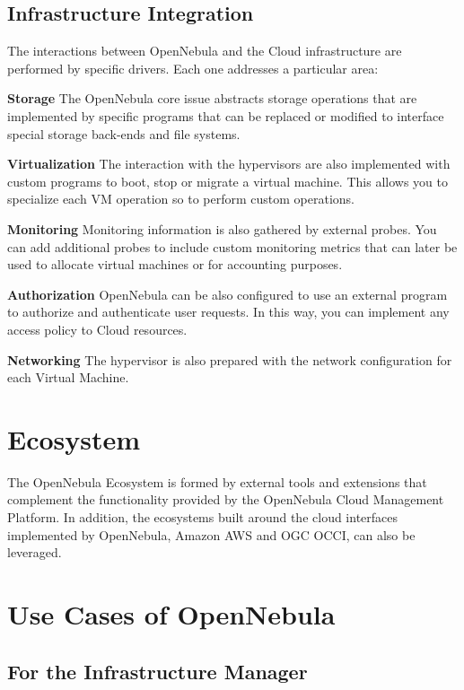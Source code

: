 \documentclass[9pt,twocolumn,twoside]{styles/osajnl}
\newcommand{\TODO}[2][]{\todo[color=red!10,inline,#1]{#2}}
\newcommand{\TE}{\TODO{Term}}
\begin{document}
\subsection{Infrastructure Integration}

The interactions between OpenNebula and the {Cloud 
infrastructure}\cite{www-opennebula-infraintegration} are 
performed by specific drivers. Each one addresses a particular area:

\textbf{Storage} The OpenNebula core \TE issue abstracts storage 
operations that are implemented by specific programs that can be 
replaced or modified to interface special storage back-ends and file 
systems.

\textbf{Virtualization} The interaction with the hypervisors are also 
implemented with custom programs to boot, stop or migrate a virtual 
machine. This allows you to specialize each VM operation so to 
perform custom operations.

\textbf{Monitoring} Monitoring information is also gathered by 
external probes. You can add additional probes to include custom 
monitoring metrics that can later be used to allocate virtual 
machines or for accounting purposes.

\textbf{Authorization} OpenNebula can be also configured to use an 
external program to authorize and authenticate user requests. In this 
way, you can implement any access policy to Cloud resources.

\textbf{Networking} The hypervisor is also prepared with the network 
configuration for each Virtual Machine.

\section{Ecosystem}

The {OpenNebula Ecosystem}\cite{www-opennebula-ecosystem} is formed by
external tools and extensions that complement the functionality
provided by the OpenNebula Cloud Management Platform. In addition, the
ecosystems \TODO{needs to be capitalized} built around the cloud
interfaces implemented by OpenNebula, Amazon AWS and OGC OCCI, can
also be leveraged.

\section{Use Cases of OpenNebula}

\subsection{For the Infrastructure Manager}
\end{document}
